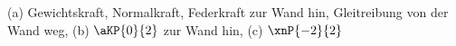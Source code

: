 (a) Gewichtskraft, Normalkraft, Federkraft zur Wand hin, Gleitreibung von der Wand weg, (b) $\aKP{0}{2}$ zur Wand hin, (c) $\xnP{-2}{2}$
